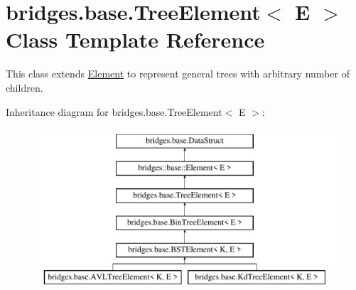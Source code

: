 \hypertarget{classbridges_1_1base_1_1_tree_element}{}\section{bridges.\+base.\+Tree\+Element$<$ E $>$ Class Template Reference}
\label{classbridges_1_1base_1_1_tree_element}


This class extends \mbox{\hyperlink{classbridges_1_1base_1_1_element}{Element}} to represent general trees with arbitrary number of children.  


Inheritance diagram for bridges.\+base.\+Tree\+Element$<$ E $>$\+:\begin{figure}[H]
\begin{center}
\leavevmode
\includegraphics[height=6.000000cm]{classbridges_1_1base_1_1_tree_element}
\end{center}
\end{figure}
